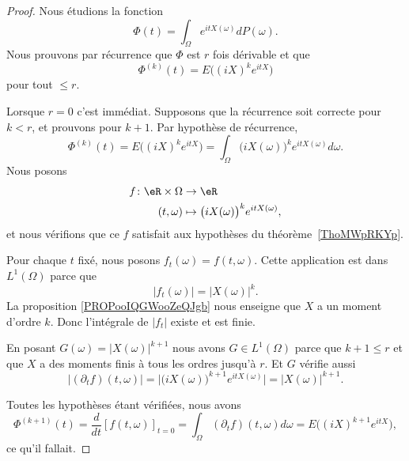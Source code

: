 \begin{proof}
	Nous étudions la fonction
	\begin{equation}
		\Phi(t)=\int_{\Omega} e^{itX(\omega)}dP(\omega).
	\end{equation}
	Nous prouvons par récurrence que \( \Phi\) est \( r\) fois dérivable et que
	\begin{equation}
		\Phi^{(k)}(t)=E\big( (iX)^ke^{itX} \big)
	\end{equation}
	pour tout \( \leq r\).

	Lorsque \( r=0\) c'est immédiat. Supposons que la récurrence soit correcte pour \( k<r\), et prouvons pour \( k+1\). Par hypothèse de récurrence,
	\begin{equation}
		\Phi^{(k)}(t)=E\big( (iX)^ke^{itX} \big)=\int_{\Omega}\big( iX(\omega) \big)^ke^{itX(\omega)}d\omega.
	\end{equation}
	Nous posons
	\begin{equation}
		\begin{aligned}
			f\colon \eR\times \Omega & \to \eR                                         \\
			(t,\omega)               & \mapsto\big( iX(\omega) \big)^ke^{itX(\omega)},
		\end{aligned}
	\end{equation}
	et nous vérifions que ce \( f\) satisfait aux hypothèses du théorème~\ref{ThoMWpRKYp}.
	\begin{subproof}
		\spitem[\( f_t\in L(\Omega)\)]
		Pour chaque \( t\) fixé, nous posons \( f_t(\omega)=f(t,\omega)\). Cette application est dans \( L^1(\Omega)\) parce que
		\begin{equation}
			| f_t(\omega) |=| X(\omega) |^k.
		\end{equation}
		La proposition \ref{PROPooIQGWooZeQJgb} nous enseigne que \( X\) a un moment d'ordre \( k\). Donc l'intégrale de \( | f_t |\) existe et est finie.

		\spitem[Majoration]
		En posant \( G(\omega)=| X(\omega) |^{k+1}\) nous avons \( G\in L^1(\Omega)\) parce que \( k+1\leq r\) et que \( X\) a des moments finis à tous les ordres jusqu'à \( r\). Et \( G\) vérifie aussi
		\begin{equation}
			| (\partial_tf)(t,\omega) |=\big| \big( iX(\omega) \big)^{k+1}e^{itX(\omega)} \big|=| X(\omega) |^{k+1}.
		\end{equation}
	\end{subproof}
	Toutes les hypothèses étant vérifiées, nous avons
	\begin{equation}
		\Phi^{(k+1)}(t)=\frac{d}{dt} \left[ f(t,\omega)  \right]_{t=0}=\int_{\Omega}(\partial_tf)(t,\omega)d\omega=E\big( (iX)^{k+1}e^{itX} \big),
	\end{equation}
	ce qu'il fallait.
\end{proof}

